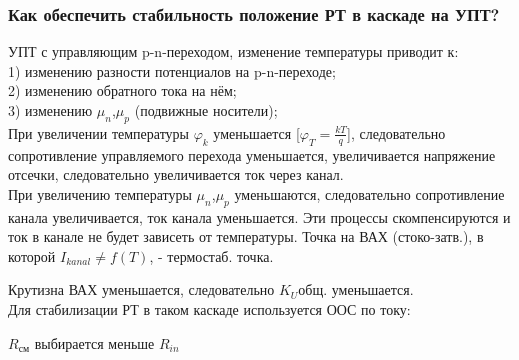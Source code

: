 \subsubsection{Как обеспечить стабильность положение РТ в каскаде на УПТ?}

УПТ с управляющим p-n-переходом, изменение температуры приводит к:\\
1) изменению разности потенциалов на p-n-переходе;\\
2) изменению обратного тока на нём;\\
3) изменению $\mu_{n}$,$\mu_{p}$ (подвижные носители);\\
При увеличении температуры $\varphi_{k}$ уменьшается [$\varphi_{T}=\frac{kT}{q}$], следовательно сопротивление управляемого перехода уменьшается, увеличивается напряжение отсечки, следовательно увеличивается ток через канал.\\
При увеличению температуры $\mu_{n}$,$\mu_{p}$ уменьшаются, следовательно сопротивление канала увеличивается, ток канала уменьшается.
Эти процессы скомпенсируются и ток в канале не будет зависеть от температуры. Точка на ВАХ (стоко-затв.), в которой $I_{kanal}\ne f(T)$, - термостаб. точка.
\begin{center}
\begin{figure}[h!]
\end{figure}
\end{center}
Крутизна ВАХ уменьшается, следовательно $K_{U}$общ. уменьшается.\\
Для стабилизации РТ в таком каскаде используется ООС по току:
\begin{center}
\begin{figure}[h!]
\end{figure}
\end{center}

$R_{\text{см}}$ выбирается меньше $R_{in}$
\begin{center}
\begin{figure}[h!]
\end{figure}
\end{center}

